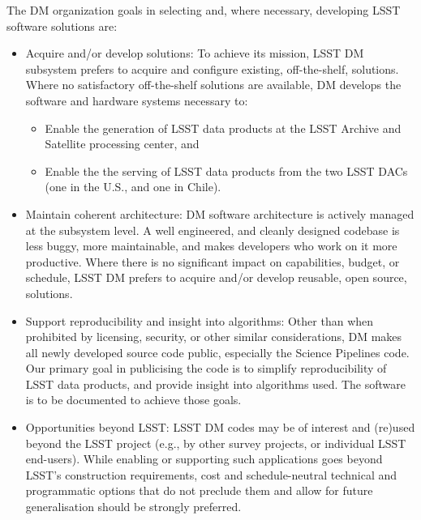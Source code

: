 The DM organization goals in selecting and, where necessary, developing LSST software solutions are:

\begin{itemize}
	\item Acquire and/or develop solutions: To achieve its mission, LSST DM subsystem prefers to acquire and configure existing, off-the-shelf, solutions. Where no satisfactory off-the-shelf solutions are available, DM develops the software and hardware systems necessary to:
\begin{itemize}
	\item Enable the generation of LSST data products at the LSST Archive and Satellite processing center, and
	\item Enable the the serving of LSST data products from the two LSST DACs (one in the U.S., and one in Chile).
\end{itemize}
	\item Maintain coherent architecture: DM software architecture is actively managed at the subsystem level. A well engineered, and cleanly designed codebase is less buggy, more maintainable, and makes developers who work on it more productive. Where there is no significant impact on capabilities, budget, or schedule, LSST DM prefers to acquire and/or develop reusable, open source, solutions.
	\item Support reproducibility and insight into algorithms: Other than when prohibited by licensing, security, or other similar considerations, DM makes all newly developed source code public, especially the Science Pipelines code. Our primary goal in publicising the code is to simplify reproducibility of LSST data products, and provide insight into algorithms used. The software is to be documented to achieve those goals. 
	\item Opportunities beyond LSST: LSST DM codes may be of interest and (re)used beyond the LSST project (e.g., by other survey projects, or individual LSST end-users). While enabling or supporting such applications goes beyond LSST’s construction requirements, cost and schedule-neutral technical and programmatic options that do not preclude them and allow for future generalisation should be strongly preferred.


\end{itemize}


